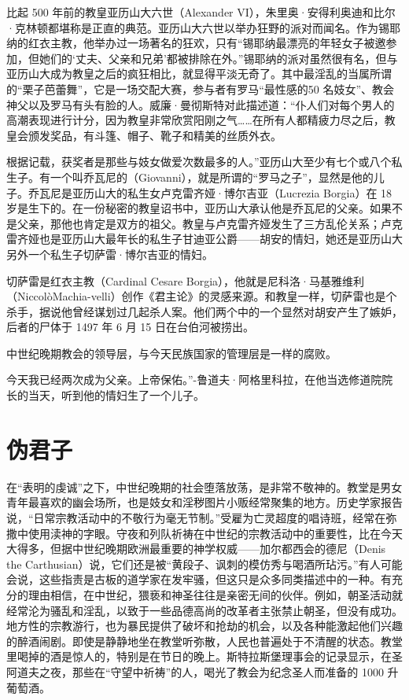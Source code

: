 比起 500 年前的教皇亚历山大六世（Alexander VI），朱里奥·安得利奥迪和比尔·克林顿都堪称是正直的典范。亚历山大六世以举办狂野的派对而闻名。作为锡耶纳的红衣主教，他举办过一场著名的狂欢，只有“锡耶纳最漂亮的年轻女子被邀参加，但她们的‘丈夫、父亲和兄弟’都被排除在外。”锡耶纳的派对虽然很有名，但与亚历山大成为教皇之后的疯狂相比，就显得平淡无奇了。其中最淫乱的当属所谓的“栗子芭蕾舞”，它是一场交配大赛，参与者有罗马“最性感的50 名妓女”、教会神父以及罗马有头有脸的人。威廉·曼彻斯特对此描述道：“仆人们对每个男人的高潮表现进行计分，因为教皇非常欣赏阳刚之气……在所有人都精疲力尽之后，教皇会颁发奖品，有斗篷、帽子、靴子和精美的丝质外衣。

根据记载，获奖者是那些与妓女做爱次数最多的人。”亚历山大至少有七个或八个私生子。有一个叫乔瓦尼的（Giovanni），就是所谓的“罗马之子”，显然是他的儿子。乔瓦尼是亚历山大的私生女卢克雷齐娅·博尔吉亚（Lucrezia Borgia）在 18 岁是生下的。在一份秘密的教皇诏书中，亚历山大承认他是乔瓦尼的父亲。如果不是父亲，那他也肯定是双方的祖父。教皇与卢克雷齐娅发生了三方乱伦关系；卢克雷齐娅也是亚历山大最年长的私生子甘迪亚公爵——胡安的情妇，她还是亚历山大另外一个私生子切萨雷·博尔吉亚的情妇。

切萨雷是红衣主教（Cardinal Cesare Borgia），他就是尼科洛·马基雅维利（NiccolòMachia-velli）创作《君主论》的灵感来源。和教皇一样，切萨雷也是个杀手，据说他曾经谋划过几起杀人案。他们两个中的一个显然对胡安产生了嫉妒，后者的尸体于 1497 年 6 月 15 日在台伯河被捞出。

中世纪晚期教会的领导层，与今天民族国家的管理层是一样的腐败。

\begin{tcolorbox}
今天我已经两次成为父亲。上帝保佑。”-鲁道夫·阿格里科拉，在他当选修道院院长的当天，听到他的情妇生了一个儿子。 
\end{tcolorbox}

\section{伪君子}
在“表明的虔诚”之下，中世纪晚期的社会堕落放荡，是非常不敬神的。教堂是男女青年最喜欢的幽会场所，也是妓女和淫秽图片小贩经常聚集的地方。历史学家报告说，“日常宗教活动中的不敬行为毫无节制。”受雇为亡灵超度的唱诗班，经常在弥撒中使用渎神的字眼。守夜和列队祈祷在中世纪的宗教活动中的重要性，比在今天大得多，但据中世纪晚期欧洲最重要的神学权威——加尔都西会的德尼（Denis the Carthusian）说，它们还是被“黄段子、讽刺的模仿秀与喝酒所玷污。”有人可能会说，这些指责是古板的道学家在发牢骚，但这只是众多同类描述中的一种。有充分的理由相信，在中世纪，猥亵和神圣往往是亲密无间的伙伴。例如，朝圣活动就经常沦为骚乱和淫乱，以致于一些品德高尚的改革者主张禁止朝圣，但没有成功。地方性的宗教游行，也为暴民提供了破坏和抢劫的机会，以及各种能激起他们兴趣的醉酒闹剧。即使是静静地坐在教堂听弥散，人民也普遍处于不清醒的状态。教堂里喝掉的酒是惊人的，特别是在节日的晚上。斯特拉斯堡理事会的记录显示，在圣阿道夫之夜，那些在“守望中祈祷”的人，喝光了教会为纪念圣人而准备的 1000 升葡萄酒。

